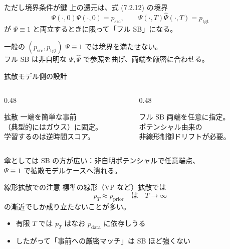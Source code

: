 \asmain
\begin{frame}{ただし境界条件が鍵}
    上の還元は、式 (7.2.12) の境界
    \[
        \Psi(\cdot,0)\widehat\Psi(\cdot,0)=p_{\mathrm{src}},
        \qquad
        \Psi(\cdot,T)\widehat\Psi(\cdot,T)=p_{\mathrm{tgt}}
    \]
    が $\Psi\equiv 1$ と両立するときに限って「フル SB」になる。
    \begin{alertblock}{一般の $(p_{\mathrm{src}},p_{\mathrm{tgt}})$}
        $\Psi\equiv 1$ では境界を満たせない。\\
        フル SB は非自明な $\Psi,\widehat\Psi$ で参照を曲げ、両端を厳密に合わせる。
    \end{alertblock}
\end{frame}
\asmain
\begin{frame}{拡散モデル側の設計}
    \begin{columns}[T,onlytextwidth]
        \begin{column}{0.48\textwidth}
            \begin{block}{拡散}
                一端を簡単な事前\\
                （典型的にはガウス）に固定。\\
                学習するのは逆時間スコア。
            \end{block}
        \end{column}
        \begin{column}{0.48\textwidth}
            \begin{block}{フル SB}
                両端を任意に指定。\\
                ポテンシャル由来の\\
                非線形制御ドリフトが必要。
            \end{block}
        \end{column}
    \end{columns}
    \vfill
    傘としては SB の方が広い：非自明ポテンシャルで任意端点、\\
    $\Psi\equiv 1$ で拡散モデルケースへ潰れる。
\end{frame}
\asmain
\begin{frame}{線形拡散での注意}
    標準の線形（VP など）拡散では
    \[
        p_T\approx p_{\mathrm{prior}}
        \quad\text{は}\quad
        T\to\infty
    \]
    の漸近でしか成り立たないことが多い。
    \begin{itemize}
        \item 有限 $T$ では $p_T$ はなお $p_{\mathrm{data}}$ に依存しうる
        \item したがって「事前への厳密マッチ」は SB ほど強くない
    \end{itemize}
\end{frame}
